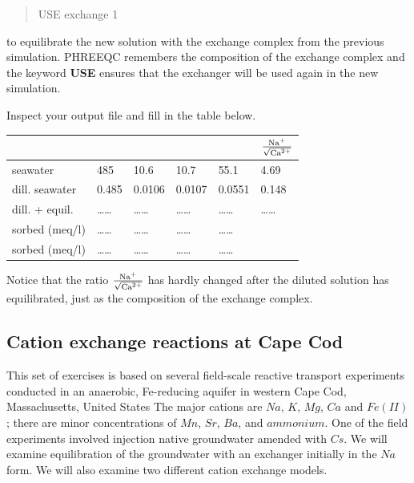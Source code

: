 \begin{quote}
USE exchange 1
\end{quote}

to equilibrate the new solution with the exchange complex from the previous simulation. 
PHREEQC remembers the composition of the exchange complex and the keyword \textbf{USE} 
ensures that the exchanger will be used again in the new simulation.

Inspect your output file and fill in the table below.

\begin{table}[h]
\centering
\footnotesize
\begin{tabular}{llllll}
\toprule
 & \na	& \ka & \ca & \mg & $\frac{\text{Na}^{+}}{\sqrt{\text{Ca}^{2+}}}$ \\
\midrule
seawater 				& 485   & 10.6   & 10.7   & 55.1   & 4.69 \\
dill. seawater  & 0.485 & 0.0106 & 0.0107 & 0.0551 & 0.148 \\
dill. + equil.  & \ldots\ldots & \ldots\ldots & \ldots\ldots & \ldots\ldots & \ldots\ldots \\
sorbed (meq/l)  & \ldots\ldots & \ldots\ldots & \ldots\ldots & \ldots\ldots & \\
sorbed (meq/l)  & \ldots\ldots & \ldots\ldots & \ldots\ldots & \ldots\ldots & \\ 
\bottomrule
\end{tabular}
\end{table}

Notice that the ratio $\frac{\text{Na}^{+}}{\sqrt{\text{Ca}^{2+}}}$ has hardly changed after the diluted solution has equilibrated, just as the composition of the exchange complex.

\subsection{Cation exchange reactions at Cape Cod}

This set of exercises is based on several field-scale reactive transport experiments 
conducted in an anaerobic, Fe-reducing aquifer in 
western Cape Cod, Massachusetts, United States 
\citep{fox_2010,Smith_2017} 
The major cations are $Na$, $K$, $Mg$, $Ca$ and $Fe(II)$; there are minor 
concentrations of $Mn$, $Sr$, $Ba$, and $ammonium$.  
One of the field experiments involved injection native groundwater amended with $Cs$.  
We will examine equilibration of the groundwater with an exchanger
initially in the $Na$ form.  
We will also examine two different cation exchange models.

